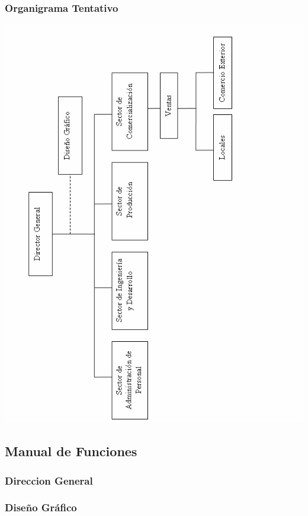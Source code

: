 \documentclass[a4paper,10pt,titlepage]{article}
\begin{document}
\subsubsection*{\textbf{Organigrama Tentativo}}
\begin {center}
\includegraphics[width=400pt]{./OrganigramaTentativo.png}
\end{center}


\subsection{ Manual de Funciones }

\subsubsection{Direccion General}

\subsubsection{Dise\~no Gr\'afico}
\end{document}
